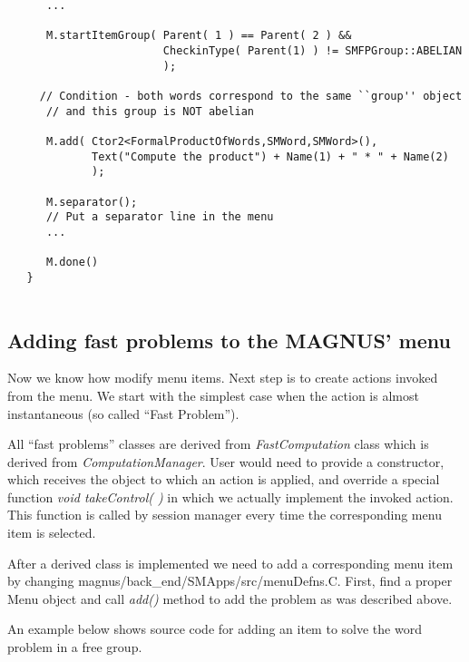 \documentclass[12pt]{article}
\def\nsmagnus{MAGNUS}
\begin{document}
\begin{verbatim}
      ...

      M.startItemGroup( Parent( 1 ) == Parent( 2 ) &&
                        CheckinType( Parent(1) ) != SMFPGroup::ABELIAN
                        );

     // Condition - both words correspond to the same ``group'' object
      // and this group is NOT abelian
      
      M.add( Ctor2<FormalProductOfWords,SMWord,SMWord>(),
             Text("Compute the product") + Name(1) + " * " + Name(2)
             );
      
      M.separator();
      // Put a separator line in the menu
      ...

      M.done()
   }
          
  \end{verbatim}
  \normalsize

  \subsection{ Adding fast problems to the \nsmagnus' menu}
  Now we know how modify menu items. Next step is to create actions
  invoked from the menu. We start with the simplest case when the action
  is almost instantaneous (so called ``Fast Problem''). 

  All ``fast problems'' classes are derived from \emph{FastComputation} class
  which is derived from \emph{ComputationManager}. 
  User would need to provide a constructor, which  receives
  the object to which an action is applied, and override a special function
  \emph{ void takeControl( )} in which we actually implement the invoked action.
  This function is called by session manager every time the corresponding 
  menu item is selected.

  After a derived class is implemented we need to add a corresponding menu 
  item by changing magnus/back\_end/SMApps/src/menuDefns.C.
  First, find a proper Menu object and call \emph{add()} method to 
  add the problem as was described above.

  An example below shows  source code for adding an item 
  to  solve the word problem in a free group.
\end{document}
